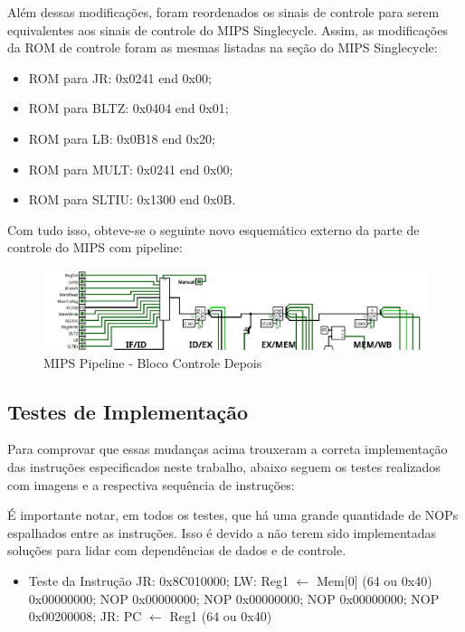 \documentclass{report}
\begin{document}
        Além dessas modificações, foram reordenados os sinais de controle para serem equivalentes aos sinais de controle do MIPS Singlecycle.
        Assim, as modificações da ROM de controle foram as mesmas listadas na seção do MIPS Singlecycle:
        \begin{itemize}
            \item ROM para JR: 0x0241 end 0x00;
            \item ROM para BLTZ: 0x0404 end 0x01;
            \item ROM para LB: 0x0B18 end 0x20;
            \item ROM para MULT: 0x0241 end 0x00;
            \item ROM para SLTIU: 0x1300 end 0x0B.
        \end{itemize}

        Com tudo isso, obteve-se o seguinte novo esquemático externo da parte de controle do MIPS com pipeline:
        \begin{figure}[h!]
            \centering
            \includegraphics[width=\linewidth]{images/prints/Pipeline/Bloco de Controle Pipeline Depois.png}
            \caption{\label{print:pipeline_cb_after} MIPS Pipeline - Bloco Controle Depois}
        \end{figure}

        \subsection{Testes de Implementação}
        Para comprovar que essas mudanças acima trouxeram a correta implementação das instruções especificados neste trabalho,
        abaixo seguem os testes realizados com imagens e a respectiva sequência de instruções:
        
        É importante notar, em todos os testes, que há uma grande quantidade de NOPs espalhados entre as instruções. Isso é devido
        a não terem sido implementadas soluções para lidar com dependências de dados e de controle.

        \begin{itemize}
            \item Teste da Instrução JR:
                \subitem 0x8C010000; LW: Reg1 $\leftarrow$ Mem[0] (64 ou 0x40)
                \subitem 0x00000000; NOP
                \subitem 0x00000000; NOP
                \subitem 0x00000000; NOP
                \subitem 0x00000000; NOP
                \subitem 0x00200008; JR: PC $\leftarrow$ Reg1 (64 ou 0x40)
        \end{itemize}
        
\end{document}
